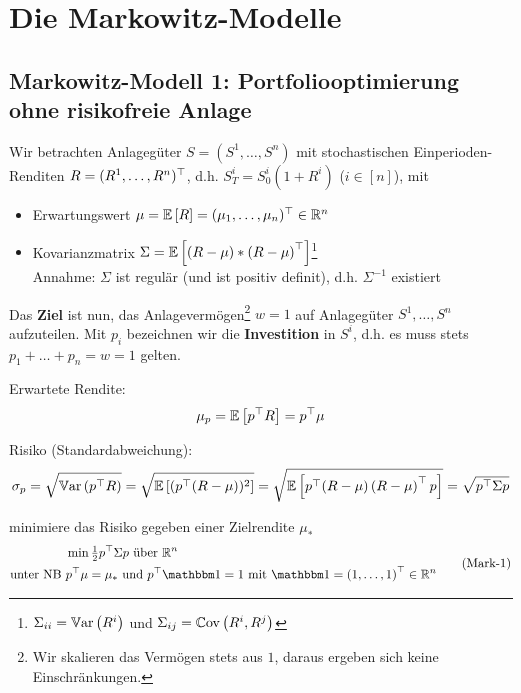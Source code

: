 \section{Die Markowitz-Modelle}

\subsection{Markowitz-Modell 1: Portfoliooptimierung ohne risikofreie Anlage}

Wir betrachten Anlagegüter $S = (S^1, \dots, S^n)$ mit stochastischen Einperioden-Renditen $R=\trans{(R^1, \dots, R^n)}$, d.h. $S_T^i = S_0^i (1+R^i)$ ($i \in [n]$), mit
\begin{itemize}
	\item Erwartungswert $\mu = \EW[R] = \trans{(\mu_1, \dots, \mu_n)} \in \Rn$
	\item Kovarianzmatrix $\Sigma = \EW[(R - \mu) * \transpose{R - \mu}]$\footnote{$\Sigma_{ii} = \Var[R^i]$ und $\Sigma_{ij} = \Cov{R^i}{R^j}$} \\
	Annahme: $\Sigma$ ist regulär (und ist positiv definit), d.h. $\Sigma^{-1}$ existiert
\end{itemize}

Das \textbf{Ziel} ist nun, das Anlagevermögen\footnote{Wir skalieren das Vermögen stets aus $1$, daraus ergeben sich keine Einschränkungen.} $w=1$ auf Anlagegüter $S^1, \dots, S^n$ aufzuteilen. 
Mit $p_i$ bezeichnen wir die \textbf{Investition} in $S^i$, d.h. es muss stets $p_1 + \dots + p_n = w = 1$ gelten.

Erwartete Rendite:
\begin{equation*}
	\mu_p = \EW[\trans{p} R] = \trans{p} \mu
\end{equation*}

Risiko (Standardabweichung): 
\begin{equation*}
	\sigma_p = \sqrt{\Var[\trans{p}R]} = \sqrt{\EW[(\trans{p} (R-\mu))^2]} = \sqrt{\EW[\trans{p}(R-\mu)\transpose{R-\mu} p]} = \sqrt{\trans{p} \Sigma p}
\end{equation*}

minimiere das Risiko gegeben einer Zielrendite $\mu_\ast$
\begin{equation*}
	\begin{aligned}
	&\min \tfrac{1}{2} \trans{p} \Sigma p \text{ über } \Rn  \\
	\text{unter NB } &\trans{p} \mu = \mu_\ast \und \trans{p} \one = 1 \mit \one = \transpose{1, \dots, 1} \in \Rn
	\end{aligned}
	\tag{Mark-1} \label{eq: mark-1}
\end{equation*}

